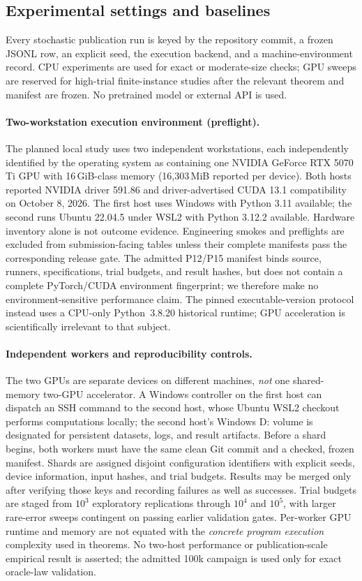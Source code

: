 \subsection{Experimental settings and baselines}

Every stochastic publication run is keyed by the repository commit, a frozen
JSONL row, an explicit seed, the execution backend, and a machine-environment
record. CPU experiments are used for exact or moderate-size checks; GPU sweeps
are reserved for high-trial finite-instance studies after the relevant theorem
and manifest are frozen. No pretrained model or external API is used.

\paragraph{Two-workstation execution environment (preflight).}
The planned local study uses two independent workstations, each independently
identified by the operating system as containing one NVIDIA GeForce RTX 5070 Ti
GPU with 16\,GiB-class memory (16{,}303\,MiB reported per device).
Both hosts reported NVIDIA driver 591.86 and driver-advertised CUDA 13.1
compatibility on October 8, 2026. The first host uses Windows with Python
3.11 available; the second runs Ubuntu 22.04.5 under WSL2 with Python 3.12.2
available. Hardware inventory alone is not outcome evidence. Engineering
smokes and preflights are excluded from submission-facing tables unless their
complete manifests pass the corresponding release gate. The admitted P12/P15
manifest binds source, runners, specifications, trial budgets, and result
hashes, but does not contain a complete PyTorch/CUDA environment fingerprint;
we therefore make no environment-sensitive performance claim. The pinned executable-version protocol instead uses a
CPU-only Python~3.8.20 historical runtime; GPU acceleration is scientifically
irrelevant to that subject.

\paragraph{Independent workers and reproducibility controls.}
The two GPUs are separate devices on different machines, \emph{not} one
shared-memory two-GPU accelerator. A Windows controller on the first host
can dispatch an SSH command to the second host, whose Ubuntu WSL2 checkout
performs computations locally; the second host's Windows D: volume is
designated for persistent datasets, logs, and result artifacts. Before a
shard begins, both workers must have the same clean Git commit and
a checked, frozen manifest. Shards are assigned disjoint configuration
identifiers with explicit seeds, device information, input hashes, and
trial budgets. Results may be merged only after verifying those keys and
recording failures as well as successes. Trial budgets are staged from
$10^3$ exploratory replications through $10^4$ and $10^5$, with larger
rare-error sweeps contingent on passing earlier validation gates.
Per-worker GPU runtime and memory are not equated with the
\emph{concrete program execution} complexity used in theorems.
No two-host performance or publication-scale empirical result is asserted;
the admitted 100k campaign is used only for exact oracle-law validation.

